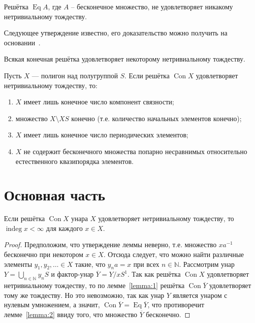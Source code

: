\documentclass[11pt,twoside,draft
]{article}
\def\Con{\operatorname{Con}}
\def\Eq{\operatorname{Eq}}
\def\indeg{\operatorname{indeg}}
\begin{document}
\begin{lemma} \label{lemma:2}
	Решётка $\Eq A$, где $A$ -- бесконечное множество, не удовлетворяет никакому нетривиальному тождеству.
\end{lemma}

Следующее утверждение известно, его доказательство можно получить на основании~\cite[следствие 3.14 и теорема 8 главы VI]{Kohn_9}.
\begin{lemma}\label{lemma:3}
	Всякая конечная решётка удовлетворяет некоторому нетривиальному тождеству.
\end{lemma}

\begin{lemma}
	Пусть $X$ — полигон над полугруппой $S$.
	Если решётка $\Con X$ удовлетворяет нетривиальному тождеству, то:
	\begin{enumerate}
		\item $X$ имеет лишь конечное число компонент связности;
		\item множество $X \setminus XS$ конечно (т.е. количество начальных элементов конечно);
		\item $X$ имеет лишь конечное число периодических элементов;
		\item $X$ не содержит бесконечного множества попарно несравнимых относительно естественного квазипорядка элементов.
	\end{enumerate}
\end{lemma}

\section{Основная часть}

\begin{lemma} \label{lemma:5}
	Если решётка $\Con X$ унара $X$ удовлетворяет нетривиальному тождеству, то $\indeg x < \infty$ для каждого $x \in X$.
\end{lemma}
\begin{proof}
	Предположим, что утверждение леммы неверно, т.е. множество $xa^{-1}$ бесконечно при некотором $x \in X$.
	Отсюда следует, что можно найти различные элементы $y_1, y_2, \ldots \in X $ такие, что $y_n a = x$ при всех $n \in \mathbb{N}$.
	Рассмотрим унар $Y = \bigcup_{n \in \mathbb{N}} y_n S$ и фактор-унар $\overline{Y} = Y / x S^1$.
	Так как решётка $\Con X$ удовлетворяет нетривиальному тождеству, то по лемме~\ref{lemma:1} решётка $\Con \overline{Y}$ удовлетворяет тому же тождеству.
	Но это невозможно, так как унар $Y$ является унаром с нулевым умножением, а значит, $\Con \overline{Y} = \Eq \overline{Y}$, что противоречит лемме~\ref{lemma:2} ввиду того, что множество $\overline{Y}$ бесконечно.
\end{proof}
\end{document}
